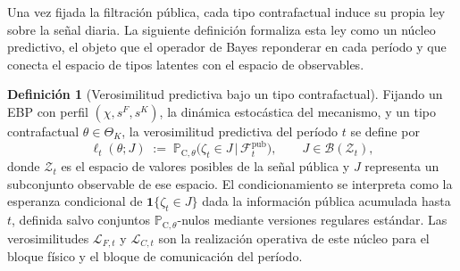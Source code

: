 \documentclass[review,authoryear,12pt]{elsarticle}
\theoremstyle{plain}
\theoremstyle{definition}
\newtheorem{definition}[theorem]{Definición}
\newcommand{\ProbC}[1]{\mathbb{P}_{\mathrm{C},#1}}
\newcommand{\ThetaK}{\Theta_K}
\newcommand{\1}{\mathbf{1}}
\begin{document}
Una vez fijada la filtración pública, cada tipo contrafactual induce su propia ley sobre la señal diaria. La siguiente definición formaliza esta ley como un núcleo predictivo, el objeto que el operador de Bayes reponderar en cada período y que conecta el espacio de tipos latentes con el espacio de observables.

\begin{definition}[Verosimilitud predictiva bajo un tipo contrafactual]\label{def:predictive-likelihood}
Fijando un EBP con perfil $(\chi,s^F,s^K)$, la dinámica estocástica del mecanismo, y un tipo contrafactual $\theta\in\ThetaK$, la verosimilitud predictiva del período $t$ se define por
\begin{equation}
\label{eq:likelihood-zeta}
\ell_t(\theta;J)\;:=\;\ProbC{\theta}\bigl(\zeta_t \in J \,\big|\, \mathcal{F}_t^{\mathrm{pub}}\bigr),
\qquad J\in\mathcal{B}(\mathcal{Z}_t),
\end{equation}
donde $\mathcal{Z}_t$ es el espacio de valores posibles de la señal pública y $J$ representa un subconjunto observable de ese espacio. El condicionamiento se interpreta como la esperanza condicional de $\mathbf{1}\{\zeta_t\in J\}$ dada la información pública acumulada hasta $t$, definida salvo conjuntos $\ProbC{\theta}$-nulos mediante versiones regulares estándar. Las verosimilitudes $\mathcal{L}_{F,t}$ y $\mathcal{L}_{C,t}$ son la realización operativa de este núcleo para el bloque físico y el bloque de comunicación del período.
\end{definition}
\end{document}
